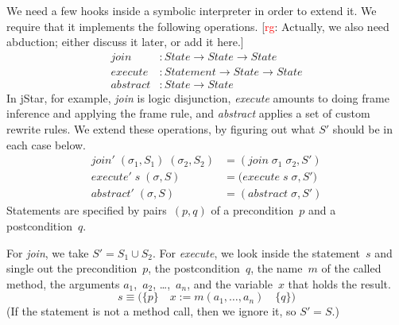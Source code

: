 \documentclass[a4paper]{article}
\newcommand{\todo}[2]{{\small [\textcolor{red}{#1}: #2]}}
\newcommand{\rg}[1]{\todo{rg}{#1}}
\theoremstyle{slanted}
\theoremstyle{definition}
\theoremstyle{remark}
\begin{document}
We need a few hooks inside a symbolic interpreter in order to extend it.
We require that it implements the following operations.
\rg{Actually, we also need abduction; either discuss it later, or add it here.}
\begin{align}
\mathit{join} &: \mathit{State} \to \mathit{State} \to \mathit{State} \\
\mathit{execute} &: \mathit{Statement} \to \mathit{State} \to \mathit{State} \\
\mathit{abstract} &: \mathit{State} \to \mathit{State}
\end{align}
In jStar, for example, \textit{join} is logic disjunction, \textit{execute} amounts to doing frame inference and applying the frame rule, and \textit{abstract} applies a set of custom rewrite rules.
We extend these operations, by figuring out what $S'$ should be in each case below.
\begin{align}
\mathit{join}'\;(\sigma_1, S_1)\;(\sigma_2,S_2) &=
    (\mathit{join}\;\sigma_1\;\sigma_2, S') \\
\mathit{execute}'\;s\;(\sigma,S) &=
    \bigl(\mathit{execute}\;s\;\sigma,S'\bigr) \\
\mathit{abstract}'\;(\sigma,S) &=
    (\mathit{abstract}\;\sigma,S')
\end{align}
Statements are specified by pairs~$(p,q)$ of a precondition~$p$ and a postcondition~$q$.

For \textit{join}, we take $S'=S_1\cup S_2$.
For \textit{execute}, we look inside the statement~$s$ and single out the precondition~$p$, the postcondition~$q$, the name~$m$ of the called method, the arguments $a_1$,~$a_2$, \dots,~$a_n$, and the variable~$x$ that holds the result.
\[ s \equiv \bigl(\{p\}\quad x := m(a_1,\ldots,a_n)\quad \{q\}\bigr) \]
(If the statement is not a method call, then we ignore it, so $S'=S$.)




\end{document}
